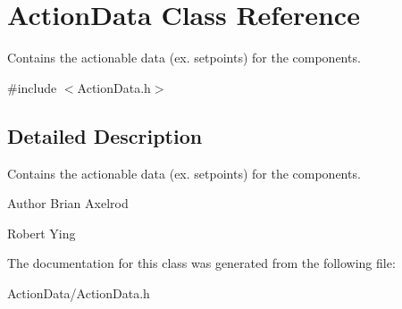 \hypertarget{class_action_data}{\section{\-Action\-Data \-Class \-Reference}
\label{class_action_data}
}


\-Contains the actionable data (ex. setpoints) for the components.  




{\ttfamily \#include $<$\-Action\-Data.\-h$>$}



\subsection{\-Detailed \-Description}
\-Contains the actionable data (ex. setpoints) for the components. 

\begin{DoxyAuthor}{\-Author}
\-Brian \-Axelrod 

\-Robert \-Ying 
\end{DoxyAuthor}


\-The documentation for this class was generated from the following file\-:\begin{DoxyCompactItemize}
\item 
\-Action\-Data/\-Action\-Data.\-h\end{DoxyCompactItemize}
